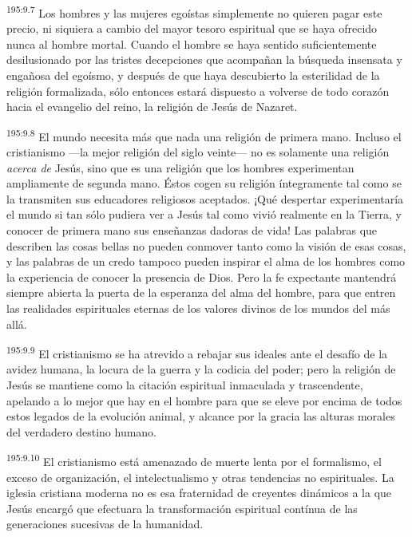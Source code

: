 \par 
\textsuperscript{195:9.7} Los hombres y las mujeres egoístas simplemente no quieren pagar este precio, ni siquiera a cambio del mayor tesoro espiritual que se haya ofrecido nunca al hombre mortal. Cuando el hombre se haya sentido suficientemente desilusionado por las tristes decepciones que acompañan la búsqueda insensata y engañosa del egoísmo, y después de que haya descubierto la esterilidad de la religión formalizada, sólo entonces estará dispuesto a volverse de todo corazón hacia el evangelio del reino, la religión de Jesús de Nazaret.

\par 
\textsuperscript{195:9.8} El mundo necesita más que nada una religión de primera mano. Incluso el cristianismo ---la mejor religión del siglo veinte--- no es solamente una religión \textit{acerca de} Jesús, sino que es una religión que los hombres experimentan ampliamente de segunda mano. Éstos cogen su religión íntegramente tal como se la transmiten sus educadores religiosos aceptados. ¡Qué despertar experimentaría el mundo si tan sólo pudiera ver a Jesús tal como vivió realmente en la Tierra, y conocer de primera mano sus enseñanzas dadoras de vida! Las palabras que describen las cosas bellas no pueden conmover tanto como la visión de esas cosas, y las palabras de un credo tampoco pueden inspirar el alma de los hombres como la experiencia de conocer la presencia de Dios. Pero la fe expectante mantendrá siempre abierta la puerta de la esperanza del alma del hombre, para que entren las realidades espirituales eternas de los valores divinos de los mundos del más allá.

\par 
\textsuperscript{195:9.9} El cristianismo se ha atrevido a rebajar sus ideales ante el desafío de la avidez humana, la locura de la guerra y la codicia del poder; pero la religión de Jesús se mantiene como la citación espiritual inmaculada y trascendente, apelando a lo mejor que hay en el hombre para que se eleve por encima de todos estos legados de la evolución animal, y alcance por la gracia las alturas morales del verdadero destino humano.

\par 
\textsuperscript{195:9.10} El cristianismo está amenazado de muerte lenta por el formalismo, el exceso de organización, el intelectualismo y otras tendencias no espirituales. La iglesia cristiana moderna no es esa fraternidad de creyentes dinámicos a la que Jesús encargó que efectuara la transformación espiritual contínua de las generaciones sucesivas de la humanidad.


